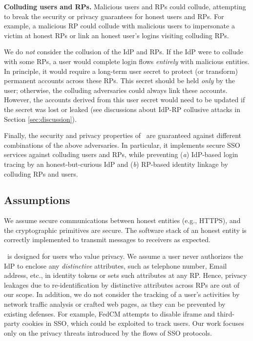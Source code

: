 \noindent \textbf{Colluding users and RPs.}
Malicious users and RPs could collude,
 attempting to break the security or privacy guarantees for honest users and RPs.
For example, a malicious RP could collude with malicious users to %
 impersonate a victim at honest RPs or link an honest user's logins visiting colluding RPs.

We do \emph{not} consider the collusion of the IdP and RPs.
If the IdP were to collude with some RPs, a user would complete login flows \emph{entirely} with malicious entities. 
In principle, it would require a long-term user secret to protect (or transform) permanent accounts across these RPs.
This secret should be held \emph{only} by the user; otherwise, the colluding adversaries could always link these accounts.
However, the accounts derived from this user secret would need to be updated if the secret was lost or leaked (see discussions about IdP-RP collusive attacks in Section \ref{sec:discussion}).

Finally, the security and privacy properties of \usso\ are guaranteed against different combinations of the above adversaries.
In particular, it implements secure SSO services against colluding users and RPs,
        while preventing (\emph{a}) IdP-based login tracing by an honest-but-curious IdP
            and (\emph{b}) RP-based identity linkage by colluding RPs and users.

\subsection{Assumptions}
We assume secure communications between honest entities (e.g., HTTPS), and the cryptographic primitives are secure. The software stack of an honest entity is correctly implemented to transmit messages to receivers as expected.

\usso\ is designed for users who value privacy. We assume a user never authorizes the IdP to enclose any \emph{distinctive} attributes, such as telephone number, Email address, etc., in identity tokens or sets such attributes at any RP. Hence, privacy leakages due to re-identification by distinctive attributes across RPs are out of our scope.
In addition, we do not consider the tracking of a user's activities by network traffic analysis or crafted web pages, as they can be prevented by existing defenses.
For example, FedCM \cite{FedCM} attempts to disable iframe and third-party cookies in SSO, which could be exploited to track users. Our work focuses only on the privacy threats introduced by the flows of SSO protocols.



